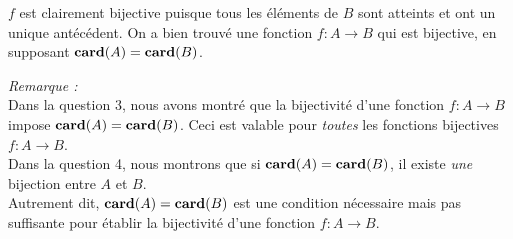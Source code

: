 \begin{exercice}
\begin{enumerate}
\begin{center}
        \end{center}
    

    $f$ est clairement bijective puisque tous les éléments de $B$ sont atteints et ont un unique antécédent. On a bien trouvé une fonction $f:A\rightarrow B$ qui est bijective, en supposant $\mathbf{card}(A) = \mathbf{card}(B)$.\\
    \end{enumerate}
\textit{Remarque :}\\
    Dans la question 3, nous avons montré que la bijectivité d'une fonction $f:A\rightarrow B$ impose $\mathbf{card}(A)=\mathbf{card}(B)$. Ceci est valable pour \textit{toutes} les fonctions bijectives $f:A\rightarrow B$.\\
    Dans la question 4, nous montrons que si $\mathbf{card}(A)=\mathbf{card}(B)$, il existe \textit{une} bijection entre $A$ et $B$.\\
    Autrement dit, $\mathbf{card}(A)=\mathbf{card}(B)$ est une condition nécessaire mais pas suffisante pour établir la bijectivité d'une fonction $f:A\rightarrow B$.\\
\end{exercice}


